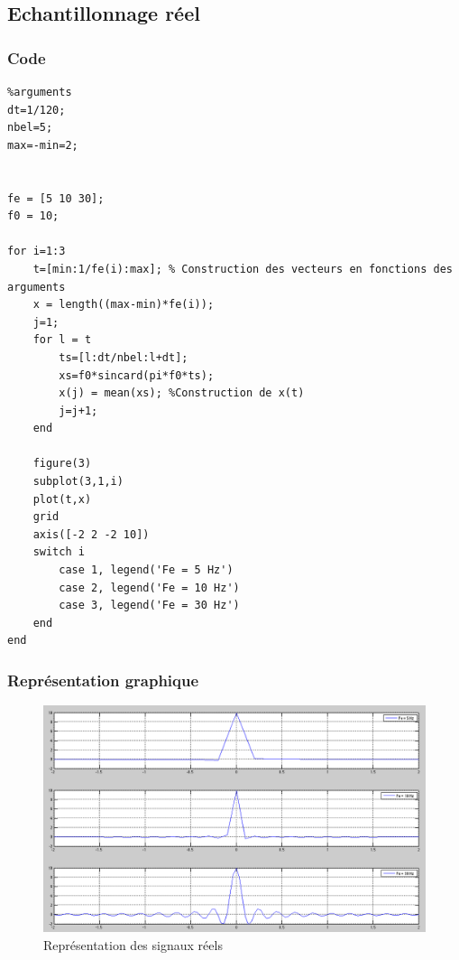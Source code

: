 \documentclass[a4paper, oneside]{report}
\begin{document}
  
  \newpage{}
 \subsection{Echantillonnage r\'eel}
 	\subsubsection{Code}
	
	 \begin{lstlisting}
%arguments
dt=1/120;
nbel=5;
max=-min=2;


fe = [5 10 30];
f0 = 10;

for i=1:3
    t=[min:1/fe(i):max]; % Construction des vecteurs en fonctions des arguments
    x = length((max-min)*fe(i));
    j=1;
    for l = t
        ts=[l:dt/nbel:l+dt];
        xs=f0*sincard(pi*f0*ts);
        x(j) = mean(xs); %Construction de x(t)
        j=j+1;
    end
    
    figure(3)
    subplot(3,1,i)
    plot(t,x)
    grid
    axis([-2 2 -2 10])
    switch i                                
        case 1, legend('Fe = 5 Hz')       
        case 2, legend('Fe = 10 Hz')    
        case 3, legend('Fe = 30 Hz')
    end
end
    \end{lstlisting}  
	
	\newpage{}
	\subsubsection{Repr\'esentation graphique}
	
	\begin{figure}[h]
   \centering
    \includegraphics[scale=0.43]{images/Exo3.png}
    \caption{Repr\'esentation des signaux r\'eels}
  \end{figure}
  
\end{document}
